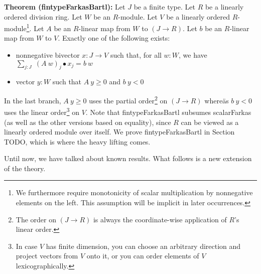 \documentclass[]{article}
\renewcommand{\.}{\hskip .75pt}
\let\r=\rightarrow
\begin{document}
\medskip \noindent
\textbf{Theorem (fintypeFarkasBartl):}
Let $J$ be a finite type.
Let $R$ be a linearly ordered division ring.
Let $W$ be an $R$-module.
Let $V$ be a linearly ordered $R$-module\footnote{We furthermore require 
monotonicity of scalar multiplication by nonnegative elements on the left.
This assumption will be implicit in later occurrences.}.
Let $A$ be an $R$-linear map from $W$ to $(J \r R)$.
Let $b$ be an $R$-linear map from $W$ to $V$.
Exactly one of the following exists:
\begin{itemize}
\item nonnegative bivector $x : J \r V$ such that, for all $w : W$, we have
$ \sum_{j : J}\; (A~w)_j \bullet x_j = b~w $
\item vector $y : W$ such that $A~y \ge 0$ and $b~y < 0$
\end{itemize}
In the last branch, $A~y \ge 0$ uses the partial order\footnote{The order on $(J \r R)$ is
always the coordinate-wise application of $R$'s linear order.} on $(J \r R)$ whereäs
$b~y < 0$ uses the linear order\footnote{In case $V$ has finite dimension, you can choose
an arbitrary direction and project vectors from $V$ onto it, or you can order elements of
$V$ lexicographically.} on $V$.
Note that fintypeFarkasBartl subsumes scalarFarkas (as well as the other versions based on equality),
since $R$ can be viewed as a linearly ordered module over itself.
We prove fintypeFarkasBartl in Section TODO, which is where the heavy lifting comes.

Until now, we have talked about known results.
What follows is a new extension of the theory.
\end{document}
